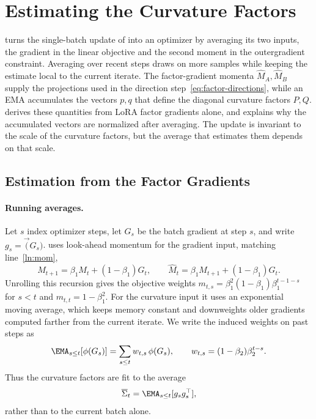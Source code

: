 
\section{Estimating the Curvature Factors}
\label{app:matnormal-m7}
 turns the single-batch update of
 into an optimizer by averaging its two inputs,
the gradient in the linear objective and the second moment in the
outergradient constraint. Averaging over recent steps draws on more samples
while keeping the estimate local to the current iterate. The factor-gradient
momenta $\widehat M_A,\widehat M_B$ supply
the projections used in the direction step~\eqref{eq:factor-directions},
while an EMA accumulates the vectors $p,q$ that define the diagonal
curvature factors $P,Q$.  derives these
quantities from LoRA factor gradients alone, and
 explains why the accumulated vectors are
normalized after averaging. The update is invariant to the scale of the
curvature factors, but the average that estimates them depends on that scale.

\subsection{Estimation from the Factor Gradients}
\label{sec:weighted-estimation-m7}

\paragraph{Running averages.} Let $s$ index optimizer steps, let $G_s$ be
the batch gradient at step $s$, and write $g_s=\vec(G_s)$.
 uses look-ahead momentum for the gradient input, matching
line~\ref{ln:mom},
\[
  M_{t+1}=\beta_1M_t+(1-\beta_1)G_t,
  \qquad
  \widehat M_t=\beta_1M_{t+1}+(1-\beta_1)G_t.
\]
Unrolling this recursion gives the objective weights
$m_{t,s}=\beta_1^2(1-\beta_1)\beta_1^{t-1-s}$ for $s<t$ and $m_{t,t}=1-\beta_1^2$.
For the curvature input it uses an exponential moving average, which keeps
memory constant and downweights older gradients computed farther from the
current iterate. We write the induced weights on past steps as
\[
  \EMA_{s \leq t}[\phi(G_s)]=\sum_{s\le t}w_{t,s}\,\phi(G_s),
  \qquad
  w_{t,s}=(1-\beta_2)\beta_2^{t-s}.
\]
Thus the curvature factors are fit to the average
\[
  \overline{\Sigma}_t=\EMA_{s\leq t}[g_sg_s^\top],
\]
rather than to the current batch alone.


